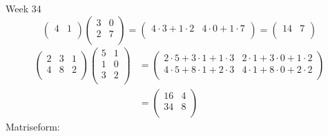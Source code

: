 


Week 34
\[
  \begin{pmatrix}
      4 & 1 \\
    \end{pmatrix}
  \begin{pmatrix}
      3 & 0 \\
      2 & 7 \\
    \end{pmatrix}
    =
    \begin{pmatrix}
      4 \cdot 3 + 1 \cdot 2 & 4 \cdot 0+1 \cdot 7\\
    \end{pmatrix}
    =
    \begin{pmatrix}
      14 & 7 \\
    \end{pmatrix}
  \]
  \begin{align*}
    \begin{pmatrix}
      2 & 3 & 1\\
      4 & 8 & 2\\
    \end{pmatrix}
    \begin{pmatrix}
      5 & 1 \\
      1 & 0 \\
      3 & 2 \\
    \end{pmatrix}
    &= 
    \begin{pmatrix}
      2 \cdot 5 + 3\cdot 1 + 1\cdot3  & 2 \cdot 1 + 3 \cdot 0 + 1 \cdot 2 \\
      4 \cdot 5 + 8 \cdot 1 + 2 \cdot 3 & 4 \cdot 1 + 8 \cdot 0 + 2\cdot2\\
    \end{pmatrix}\\
    &= 
    \begin{pmatrix}
      16 & 4 \\
      34 & 8 \\ 
    \end{pmatrix}
  \end{align*}
  Matriseform: 
